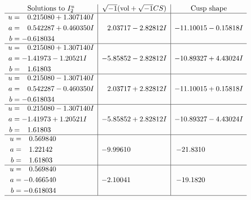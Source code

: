\documentclass[1p]{elsarticle_modified}
\theoremstyle{definition}
\newcommand{\I}{\sqrt{-1}}
\begin{document}
$$\begin{array}{c|c|c}  
\text{Solutions to }I^u_{2}& \I (\text{vol} + \sqrt{-1}CS) & \text{Cusp shape}\\
 \hline 
\begin{aligned}
u &= \phantom{-}0.215080 + 1.307140 I \\
a &= \phantom{-}0.542287 + 0.460350 I \\
b &= -0.618034\phantom{ +0.000000I}\end{aligned}
 & \phantom{-}2.03717 - 2.82812 I & -11.10015 - 0.15818 I \\ \hline\begin{aligned}
u &= \phantom{-}0.215080 + 1.307140 I \\
a &= -1.41973 - 1.20521 I \\
b &= \phantom{-}1.61803\phantom{ +0.000000I}\end{aligned}
 & -5.85852 - 2.82812 I & -10.89327 + 4.43024 I \\ \hline\begin{aligned}
u &= \phantom{-}0.215080 - 1.307140 I \\
a &= \phantom{-}0.542287 - 0.460350 I \\
b &= -0.618034\phantom{ +0.000000I}\end{aligned}
 & \phantom{-}2.03717 + 2.82812 I & -11.10015 + 0.15818 I \\ \hline\begin{aligned}
u &= \phantom{-}0.215080 - 1.307140 I \\
a &= -1.41973 + 1.20521 I \\
b &= \phantom{-}1.61803\phantom{ +0.000000I}\end{aligned}
 & -5.85852 + 2.82812 I & -10.89327 - 4.43024 I \\ \hline\begin{aligned}
u &= \phantom{-}0.569840\phantom{ +0.000000I} \\
a &= \phantom{-}1.22142\phantom{ +0.000000I} \\
b &= \phantom{-}1.61803\phantom{ +0.000000I}\end{aligned}
 & -9.99610\phantom{ +0.000000I} & -21.8310\phantom{ +0.000000I} \\ \hline\begin{aligned}
u &= \phantom{-}0.569840\phantom{ +0.000000I} \\
a &= -0.466540\phantom{ +0.000000I} \\
b &= -0.618034\phantom{ +0.000000I}\end{aligned}
 & -2.10041\phantom{ +0.000000I} & -19.1820\phantom{ +0.000000I}\\
 \hline 
 \end{array}$$\newpage
\end{document}
